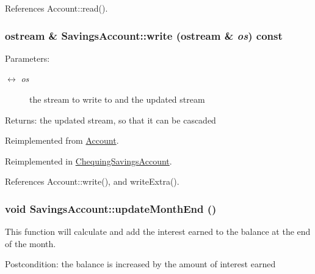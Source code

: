 References Account::read().\hypertarget{classSavingsAccount_7010b1663ff729cb05a3594c7bc8ae99}{
\subsubsection[write]{\setlength{\rightskip}{0pt plus 5cm}ostream \& SavingsAccount::write (ostream \& {\em os}) const}}
\label{classSavingsAccount_7010b1663ff729cb05a3594c7bc8ae99}


\begin{Desc}
\item[Parameters:]
\begin{description}
\item[\mbox{$\leftrightarrow$} {\em os}]the stream to write to and the updated stream \end{description}
\end{Desc}
\begin{Desc}
\item[Returns:]the updated stream, so that it can be cascaded \end{Desc}


Reimplemented from \hyperlink{classAccount_65f80b996aecc07bcb5ddd31fcb0b063}{Account}.

Reimplemented in \hyperlink{classChequingSavingsAccount_61888979bbaf273b2c20f92d2f41f226}{ChequingSavingsAccount}.

References Account::write(), and writeExtra().\hypertarget{classSavingsAccount_fedffc6bb917570025ac1e30db9e4f76}{
\subsubsection[updateMonthEnd]{\setlength{\rightskip}{0pt plus 5cm}void SavingsAccount::updateMonthEnd ()}}
\label{classSavingsAccount_fedffc6bb917570025ac1e30db9e4f76}


This function will calculate and add the interest earned to the balance at the end of the month.

\begin{Desc}
\item[Postcondition:]the balance is increased by the amount of interest earned \end{Desc}


